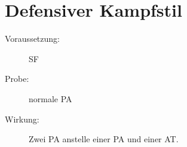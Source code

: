 \section{Defensiver Kampfstil}
\label{reaktion.defensiver_kampfstil}
\begin{description}
    \item[Voraussetzung:]
        SF 
    \item[Probe:]
        normale PA
    \item[Wirkung:]
        Zwei PA anstelle einer PA und einer AT.
\end{description}

